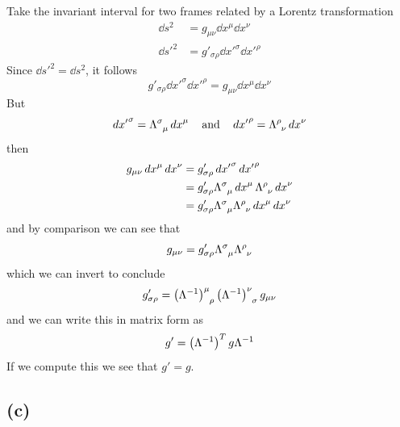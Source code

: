 \documentclass[oneside, 10pt, notitlepage]{book}
\begin{document}
Take the invariant interval for two frames related by a Lorentz transformation
\begin{equation}
\begin{split}
        \dd{s}^2 &= g_{\mu\nu}\dd{x}^{\mu}\dd{x}^{\nu} \\
        \dd{s'}^2 &= g'_{\sigma\rho}\dd{x'}^{\sigma}\dd{x'}^{\rho}
\end{split}
\end{equation}
Since \(\dd{s'}^2=\dd{s}^2\), it follows
\begin{equation}
    g'_{\sigma\rho}\dd{x'}^{\sigma}\dd{x'}^{\rho}= g_{\mu\nu}\dd{x}^{\mu}\dd{x}^{\nu}
\end{equation}
But
\begin{equation}
    \dd{x'}^{\sigma} = \tensor{\Lambda}{^{\sigma}_{\mu}}\dd{x}^{\mu} \qq{and} \dd{x'}^{\rho} = \tensor{\Lambda}{^{\rho}_{\nu}}\dd{x}^{\nu}
\end{equation}
then
\begin{equation}
\begin{split}
    g_{\mu\nu}\dd{x}^{\mu}\dd{x}^{\nu} &= g'_{\sigma\rho}\dd{x'}^{\sigma}\dd{x'}^{\rho} \\
    &= g'_{\sigma\rho}\tensor{\Lambda}{^{\sigma}_{\mu}}\dd{x}^{\mu}\tensor{\Lambda}{^{\rho}_{\nu}}\dd{x}^{\nu} \\
    &= g'_{\sigma\rho}\tensor{\Lambda}{^{\sigma}_{\mu}}\tensor{\Lambda}{^{\rho}_{\nu}}\dd{x}^{\mu}\dd{x}^{\nu}
\end{split}
\end{equation}
and by comparison we can see that
\begin{equation}
    g_{\mu\nu} = g'_{\sigma\rho}\tensor{\Lambda}{^{\sigma}_{\mu}}\tensor{\Lambda}{^{\rho}_{\nu}}
\end{equation}
which we can invert to conclude
\begin{equation}
    g'_{\sigma\rho} = \tensor{\lr{\Lambda^{-1}}}{^{\mu}_{\rho}}\tensor{\lr{\Lambda^{-1}}}{^{\nu}_{\sigma}}g_{\mu\nu}
\end{equation}
and we can write this in matrix form as
\begin{equation}
    g' = \left(\Lambda^{-1}\right)^T g \Lambda^{-1}
\end{equation}
If we compute this we see that \(g'=g\).

\subsection*{(c)}
\end{document}
